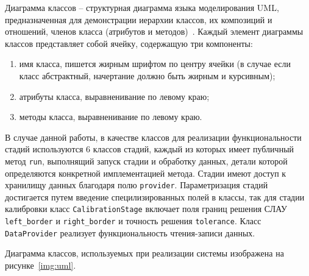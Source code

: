 Диаграмма классов -- структурная диаграмма языка моделирования UML, предназначенная для демонстрации иерархии классов,
их композиций и отношений, членов класса (атрибутов и методов)~\autocite{impl:ad}. Каждый элемент диаграммы классов представляет собой
ячейку, содержащую три компоненты:
\begin{enumerate}
    \item имя класса, пишется жирным шрифтом по центру ячейки (в случае если класс абстрактный, начертание должно быть жирным
    и курсивным);
    \item атрибуты класса, выравненивание по левому краю;
    \item методы класса, выравненивание по левому краю.
\end{enumerate}

В случае данной работы, в качестве классов для реализации функциональности стадий используются 6 классов стадий, каждый
из которых имеет публичный метод \texttt{run}, выполнящий запуск стадии и обработку данных, детали которой определяются
конкретной имплементацией метода. Стадии имеют доступ к хранилищу данных благодаря полю \texttt{provider}. Параметризация
стадий достигается путем введение специлизированных полей в классы, так для стадии калибровки класс \texttt{CalibrationStage}
включает поля границ решения СЛАУ \texttt{left\_border} и \texttt{right\_border} и точность решения \texttt{tolerance}. Класс
\texttt{DataProvider} реализует функциональность чтения-записи данных. 

Диаграмма классов, используемых при реализации системы изображена
на рисунке~\eqref{img:uml}.


